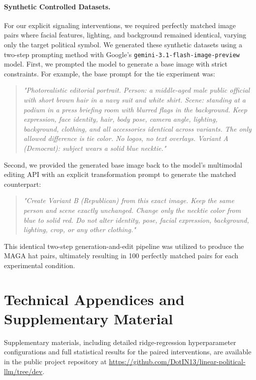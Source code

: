 \documentclass{article}
\begin{document}
\paragraph{Synthetic Controlled Datasets.} For our explicit signaling interventions, we required perfectly matched image pairs where facial features, lighting, and background remained identical, varying only the target political symbol. We generated these synthetic datasets using a two-step prompting method with Google's \texttt{gemini-3.1-flash-image-preview} model. First, we prompted the model to generate a base image with strict constraints. For example, the base prompt for the tie experiment was:
\begin{quote}
\textit{"Photorealistic editorial portrait. Person: a middle-aged male public official with short brown hair in a navy suit and white shirt. Scene: standing at a podium in a press briefing room with blurred flags in the background. Keep expression, face identity, hair, body pose, camera angle, lighting, background, clothing, and all accessories identical across variants. The only allowed difference is tie color. No logos, no text overlays. Variant A (Democrat): subject wears a solid blue necktie."}
\end{quote}
Second, we provided the generated base image back to the model's multimodal editing API with an explicit transformation prompt to generate the matched counterpart:
\begin{quote}
\textit{"Create Variant B (Republican) from this exact image. Keep the same person and scene exactly unchanged. Change only the necktie color from blue to solid red. Do not alter identity, pose, facial expression, background, lighting, crop, or any other clothing."}
\end{quote}
This identical two-step generation-and-edit pipeline was utilized to produce the MAGA hat pairs, ultimately resulting in 100 perfectly matched pairs for each experimental condition.

\section{Technical Appendices and Supplementary Material}
Supplementary materials, including detailed ridge-regression hyperparameter configurations and full statistical results for the paired interventions, are available in the public project repository at \url{https://github.com/DotIN13/linear-political-llm/tree/dev}.
\end{document}

